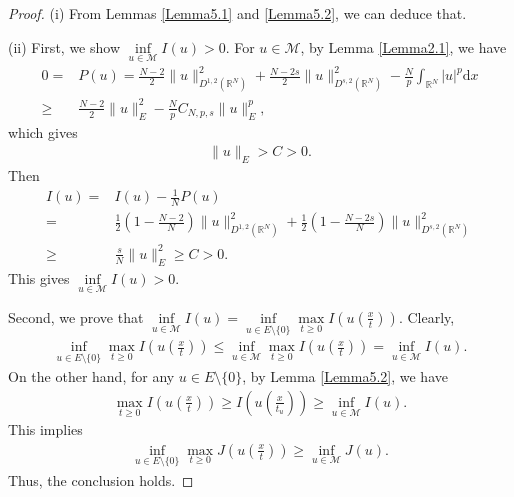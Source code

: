 \documentclass[12pt,a4paper,reqno]{amsart}
\numberwithin{equation}{section}
\begin{document}
\begin{proof}
(i)
From Lemmas \ref{Lemma5.1} and \ref{Lemma5.2},
we can deduce that.

(ii)
First, we show $\inf\limits_{u\in \mathcal{M}}I(u)>0$.
For $u\in \mathcal{M}$, by Lemma \ref{Lemma2.1},
we have
\begin{equation*}
\begin{aligned}
0
=&
P(u)
=
\frac{N-2}{2}
\|u\|_{D^{1,2}(\mathbb{R}^{N})}^{2}
+
\frac{N-2s}{2}
\|u\|_{D^{s,2}(\mathbb{R}^{N})}^{2}
-
\frac{N}{p}
\int_{\mathbb{R}^{N}}
|u|^{p}
\mathrm{d}x\\
\geqslant&
\frac{N-2}{2}
\|u\|_{E}^{2}
-
\frac{N}{p}
C_{N,p,s}
\|u\|_{E}^{p},
\end{aligned}
\end{equation*}
which gives
\begin{equation*}
\begin{aligned}
\|u\|_{E}
>C>0.
\end{aligned}
\end{equation*}
Then
\begin{equation*}
\begin{aligned}
I(u)
=&I(u)-\frac{1}{N}P(u)\\
=&
\frac{1}{2}
\left(1-\frac{N-2}{N}\right)
\|u\|_{D^{1,2}(\mathbb{R}^{N})}^{2}
+
\frac{1}{2}
\left(1-\frac{N-2s}{N}\right)
\|u\|_{D^{s,2}(\mathbb{R}^{N})}^{2}\\
\geqslant&
\frac{s}{N}
\|u\|_{E}^{2}
\geqslant
C>0.
\end{aligned}
\end{equation*}
This gives
$\inf\limits_{u\in \mathcal{M}}I(u)>0$.

Second, we prove that
$\inf\limits_{u\in \mathcal{M}}I(u)=
\inf\limits_{u\in E\setminus\{0\}}\max
\limits_{t\geqslant0}
I\left(u\left(\frac{x}{t}\right)\right)$.
Clearly,
\begin{equation*}
\begin{aligned}
\inf\limits_{u\in E\setminus\{0\}}\max
\limits_{t\geqslant0}
I\left(u\left(\frac{x}{t}\right)\right)
\leqslant
\inf\limits_{u\in \mathcal{M}}\max
\limits_{t\geqslant0}
I\left(u\left(\frac{x}{t}\right)\right)
=
\inf\limits_{u\in \mathcal{M}}I(u).
\end{aligned}
\end{equation*}
On the other hand, for any
$u\in E\setminus\{0\}$,
by Lemma \ref{Lemma5.2},
we have
\begin{equation*}
\begin{aligned}
\max
\limits_{t\geqslant0}
I\left(u\left(\frac{x}{t}\right)\right)
\geqslant
I\left(u\left(\frac{x}{t_{u}}\right)\right)
\geqslant
\inf\limits_{u\in \mathcal{M}}I(u).
\end{aligned}
\end{equation*}
This implies
\begin{equation*}
\begin{aligned}
\inf\limits_{u\in E\setminus\{0\}}\max
\limits_{t\geqslant0}
J\left(u\left(\frac{x}{t}\right)\right)
\geqslant
\inf\limits_{u\in \mathcal{M}}J(u).
\end{aligned}
\end{equation*}
Thus, the conclusion holds.


\end{proof}
\end{document}
